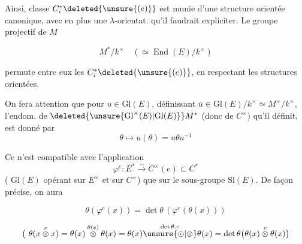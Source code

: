 Ainsi,   classe $C_i^*\deleted{\unsure{(e)}}$  est munie   d'une structure   orientée canonique,  avec en plus une $\lambda$-orientat.  qu'il faudrait expliciter. Le groupe projectif de $M$

\[
 M^*/k^\times\quad(\simeq\operatorname{End}(E)/k^\times)
\]


permute entre  eux les $C_i^*\deleted{\unsure{(e)}}$, en respectant  les structures orientées.

On fera attention que pour  $u\in\mathrm{Gl}(E)$, définissant $\bar u\in\mathrm{Gl}(E)/k^\times\simeq M^\times/k^\times$, l'endom. de $\deleted{\unsure{\mathrm{Gl}^{\times}(E)|\mathrm{Gl}(E)}}M^*$  (donc de $C^\times$) qu'il définit, est donné par
\[
 \theta\longmapsto u(\theta)=u\theta u^{-1}
\]


Ce n'est compatible avec l'application
\[
 \varphi^e:E^*\xrightarrow{\sim} C^\times(e)\subset C^*
\]
( $\mathrm{Gl}(E)$ opérant sur $E^\times$ et sur $C^\times$) que sur le sous-groupe $\mathrm{Sl}(E)$. De façon précise, on aura

\[
 \boxed{\theta(\varphi^e(x))=\det\theta\,(\varphi^e(\theta(x)))}
\]

\[
 \bigl(\ \theta(x\overset{e}{\otimes}x)=
 \theta(x)\overset{\theta(e)}{\otimes}\theta(x)=
 \theta(x)\overset{\det\theta.e}{\unsure{\odot|\otimes}}\theta(x)
 =\det\theta\bigl(\theta(x)\overset{e}{\otimes}\theta(x)\bigr)
\]

